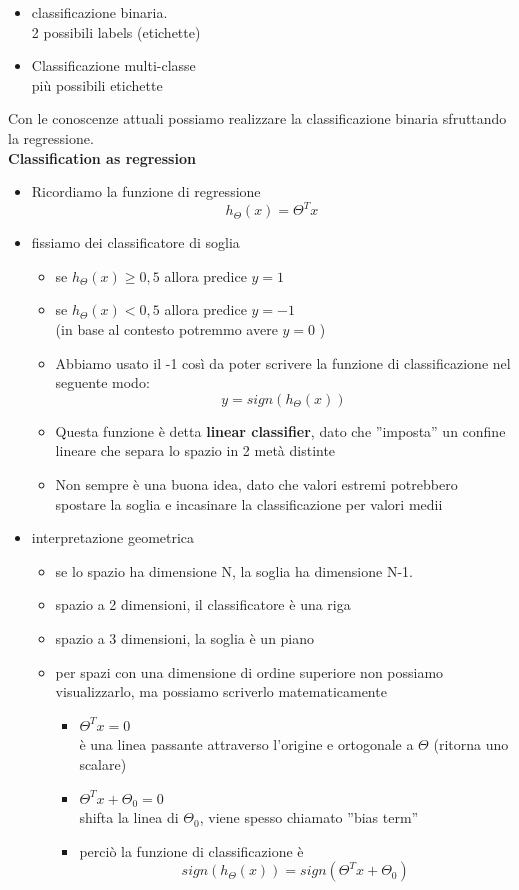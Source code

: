 \documentclass[10pt,oneside,a4paper]{article}
\begin{document}
\begin{itemize}
\item classificazione binaria.\\
2 possibili labels (etichette)
\item Classificazione multi-classe \\
più possibili etichette
\end{itemize}
Con le conoscenze attuali possiamo realizzare la classificazione binaria sfruttando la regressione. \\
\textbf{Classification as regression}
\begin{itemize}
\item Ricordiamo la funzione di regressione 
$$h_{\Theta}(x)=\Theta^{T}x$$
\item fissiamo dei classificatore di soglia

\begin{itemize}
\item se $h_{\Theta}(x) \ge 0,5$ allora predice $y=1$
\item se $h_{\Theta}(x) < 0,5$ allora predice $y=-1$\\
(in base al contesto potremmo avere $y=0$ )
\item Abbiamo usato il -1 così da poter scrivere la funzione di classificazione nel seguente modo:
$$y=sign(h_{\Theta}(x))$$
\item Questa funzione è detta \textbf{linear classifier}, dato che ''imposta'' un confine lineare che separa lo spazio in 2 metà distinte

\item Non sempre è una buona idea, dato che valori estremi potrebbero spostare la soglia e incasinare la classificazione per valori medii
\end{itemize}
\item interpretazione geometrica
\begin{itemize}
\item se lo spazio ha dimensione N, la soglia ha dimensione N-1.
\item spazio a 2 dimensioni, il classificatore è una riga
\item  spazio a 3 dimensioni, la soglia è un piano
\item per spazi con una dimensione di ordine superiore non possiamo visualizzarlo, ma possiamo scriverlo matematicamente

\begin{itemize}
\item $\Theta^{T}x=0$ \\
 è una linea passante attraverso l'origine e ortogonale a $\Theta $ (ritorna uno scalare)
 
 \item  $\Theta^{T}x+\Theta_{0}=0$ \\ shifta la linea di $\Theta_{0}$, viene spesso chiamato ''bias term''
 
 \item perciò la funzione di classificazione è 
 $$sign(h_{\Theta}(x))=sign(\Theta^{T}x+\Theta_{0})$$
\end{itemize}

\end{itemize}

\end{itemize}
\end{document}

